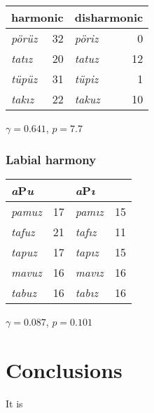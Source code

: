 \begin{example}
\begin{tabular}{l r l r}
\toprule
\multicolumn{2}{l}{harmonic} & \multicolumn{2}{l}{disharmonic} \\
\midrule
\emph{pörüz} & 32            & \emph{pöriz} & 0  \\
\emph{tatız} & 20            & \emph{tatuz} & 12 \\
\emph{tüpüz} & 31            & \emph{tüpiz} & 1  \\
\emph{takız} & 22            & \emph{takuz} & 10 \\
\bottomrule
\end{tabular}
\end{example}

$\gamma = 0.641$, $p = 7.7$


\subsubsection{Labial harmony}

\begin{example}
\begin{tabular}{l r l r}
\toprule
\multicolumn{2}{l}{\emph{a}P\emph{u}} & \multicolumn{2}{l}{\emph{a}P\emph{ı}} \\
\midrule
\emph{pamuz} & 17       & \emph{pamız} & 15 \\
\emph{tafuz} & 21       & \emph{tafız} & 11 \\
\emph{tapuz} & 17       & \emph{tapız} & 15 \\
\emph{mavuz} & 16       & \emph{mavız} & 16 \\
\emph{tabuz} & 16       & \emph{tabız} & 16 \\
\bottomrule
\end{tabular}
\end{example}

$\gamma = 0.087$, $p = 0.101$

\section{Conclusions}

\citet{Becker2011}

It is 

